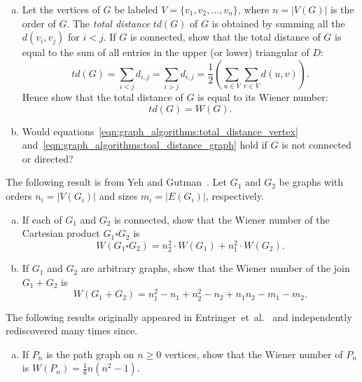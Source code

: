 \begin{problem}
\begin{enumerate}[(a)]
  \item Let the vertices of $G$ be labeled
    $V = \{v_1, v_2, \dots, v_n\}$, where $n = |V(G)|$ is the order of
    $G$. The \emph{total distance} $td(G)$ of $G$ is obtained by
    summing all the $d(v_i, v_j)$ for $i < j$. If $G$ is connected,
    show that the total distance of $G$ is equal to the sum of all
    entries in the upper (or lower) triangular of $D$:
    \begin{equation}
    \label{eqn:graph_algorithms:toal_distance_graph}
    td(G)
    =
    \sum_{i < j} d_{i,j}
    =
    \sum_{i > j} d_{i,j}
    =
    \frac{1}{2} \left(\sum_{u \in V} \sum_{v \in V} d(u,v)\right).
    \end{equation}
    Hence show that the total distance of $G$ is equal to its Wiener
    number:
    \[
    td(G)
    =
    W(G).
    \]

  \item Would
    equations~\eqref{eqn:graph_algorithms:total_distance_vertex}
    and~\eqref{eqn:graph_algorithms:toal_distance_graph} hold if $G$
    is not connected or directed?
  \end{enumerate}

\item The following result is from Yeh and
  Gutman~\cite{YehGutman1994}. Let $G_1$ and $G_2$ be graphs with
  orders $n_i = |V(G_i)|$ and sizes $m_i = |E(G_i)|$, respectively.
  \begin{enumerate}[(a)]
  \item If each of $G_1$ and $G_2$ is connected, show that the Wiener
    number of the Cartesian product $G_1 \square G_2$ is
    \[
    W(G_1 \square G_2)
    =
    n_2^2 \cdot W(G_1) + n_1^2 \cdot W(G_2).
    \]

  \item If $G_1$ and $G_2$ are arbitrary graphs, show that the Wiener
    number of the join $G_1 + G_2$ is
    \[
    W(G_1 + G_2)
    =
    n_1^2 - n_1 + n_2^2 - n_2 + n_1 n_2 - m_1 - m_2.
    \]
  \end{enumerate}

\item The following results originally appeared in
  Entringer~et~al.~\cite{EntringerEtAl1976} and independently
  rediscovered many times since.
  \begin{enumerate}[(a)]
  \item If $P_n$ is the path graph on $n \geq 0$ vertices, show that
    the Wiener number of $P_n$ is $W(P_n) = \frac{1}{6} n(n^2 - 1)$.


\end{enumerate}
\end{problem}

